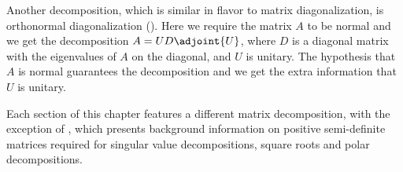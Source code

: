 %
Another decomposition, which is similar in flavor to matrix diagonalization, is orthonormal diagonalization ().  Here we require the matrix $A$ to be normal and we get the decomposition $A=UD\adjoint{U}$, where $D$ is a diagonal matrix with the eigenvalues of $A$ on the diagonal, and $U$ is unitary.  The hypothesis that $A$ is normal guarantees the decomposition and we get the extra information that $U$ is unitary.\par
%
Each section of this chapter features a different matrix decomposition, with the exception of , which presents background information on positive semi-definite matrices required for singular value decompositions, square roots and polar decompositions.